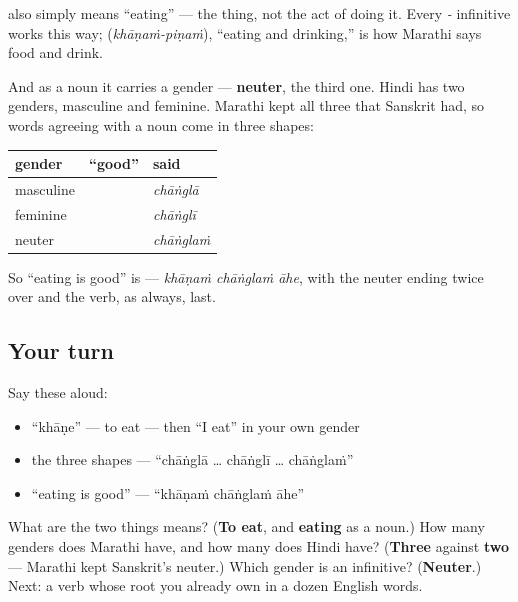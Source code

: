 \begin{grammarlens}[title={Grammar Lens: the infinitive is a neuter noun}]
\textbf{} also simply means \textquotedblleft{}eating\textquotedblright{} — the thing, not the act of doing it. Every \emph{-} infinitive works this way; \emph{} (\emph{khāṇaṁ-piṇaṁ}), \textquotedblleft{}eating and drinking,\textquotedblright{} is how Marathi says food and drink.

And as a noun it carries a gender — \textbf{neuter}, the third one. Hindi has two genders, masculine and feminine. Marathi kept all three that Sanskrit had, so words agreeing with a noun come in three shapes:

\noindent
\begin{tabularx}{\linewidth}{@{}>{\raggedright\arraybackslash}X>{\raggedright\arraybackslash}X>{\raggedright\arraybackslash}X@{}}
\toprule
\textbf{gender} & \textbf{\textquotedblleft{}good\textquotedblright{}} & \textbf{said} \\
\midrule
masculine & \mr{चांगला} & \emph{chāṅglā} \\
feminine & \mr{चांगली} & \emph{chāṅglī} \\
neuter & \mr{चांगलं} & \emph{chāṅglaṁ} \\
\bottomrule
\end{tabularx}

So \textquotedblleft{}eating is good\textquotedblright{} is \textbf{  } — \emph{khāṇaṁ chāṅglaṁ āhe}, with the neuter ending twice over and the verb, as always, last.
\end{grammarlens}

\subsection*{Your turn}
Say these aloud:

\begin{itemize}
\raggedright
  \item \textquotedblleft{}khāṇe\textquotedblright{} — to eat — then \textquotedblleft{}I eat\textquotedblright{} in your own gender
  \item the three shapes — \textquotedblleft{}chāṅglā … chāṅglī … chāṅglaṁ\textquotedblright{}
  \item \textquotedblleft{}eating is good\textquotedblright{} — \textquotedblleft{}khāṇaṁ chāṅglaṁ āhe\textquotedblright{}
\end{itemize}

\begin{tcolorbox}[breakable,colback=teal!4,colframe=teal!35!black,title={Before you move on}]
What are the two things \textbf{} means? (\textbf{To eat}, and \textbf{eating} as a noun.) How many genders does Marathi have, and how many does Hindi have? (\textbf{Three} against \textbf{two} — Marathi kept Sanskrit's neuter.) Which gender is an infinitive? (\textbf{Neuter}.) Next: a verb whose root you already own in a dozen English words.
\end{tcolorbox}
